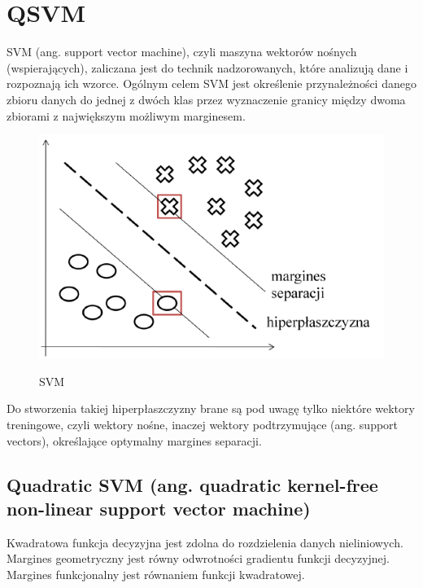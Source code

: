 \documentclass[[10pt,a4paper]{article}
\begin{document}
\newpage
\section{QSVM}
SVM (ang. support vector machine), czyli maszyna wektorów nośnych
(wspierających), zaliczana jest do technik nadzorowanych, które analizują dane i rozpoznają
ich wzorce. Ogólnym celem SVM jest określenie przynależności danego zbioru danych do
jednej z dwóch klas przez wyznaczenie granicy między dwoma zbiorami z największym
możliwym marginesem.

\begin{figure}[h]
\centering
\includegraphics{SVM}\\
\caption{SVM}
\end{figure}

Do stworzenia takiej hiperpłaszczyzny brane są pod uwagę tylko niektóre wektory
treningowe, czyli wektory nośne, inaczej wektory podtrzymujące (ang. support vectors),
określające optymalny margines separacji.

\subsection{Quadratic SVM (ang. quadratic kernel-free non-linear support vector machine)}

Kwadratowa funkcja decyzyjna jest zdolna do rozdzielenia danych nieliniowych. 
Margines geometryczny jest równy odwrotności gradientu funkcji decyzyjnej.
Margines funkcjonalny jest równaniem funkcji kwadratowej.
\end{document}
